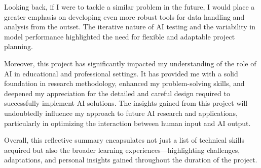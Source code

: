 Looking back, if I were to tackle a similar problem in the future, I would place a greater emphasis on developing even more robust tools for data handling and analysis from the outset. The iterative nature of AI testing and the variability in model performance highlighted the need for flexible and adaptable project planning. 

Moreover, this project has significantly impacted my understanding of the role of AI in educational and professional settings. It has provided me with a solid foundation in research methodology, enhanced my problem-solving skills, and deepened my appreciation for the detailed and careful design required to successfully implement AI solutions. The insights gained from this project will undoubtedly influence my approach to future AI research and applications, particularly in optimizing the interaction between human input and AI output.

Overall, this reflective summary encapsulates not just a list of technical skills acquired but also the broader learning experiences—highlighting challenges, adaptations, and personal insights gained throughout the duration of the project.
